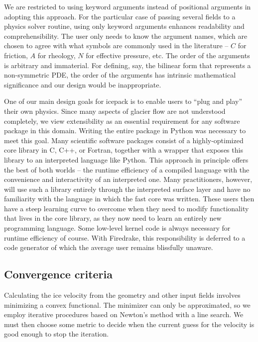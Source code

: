 \documentclass{article}
\theoremstyle{definition}
\theoremstyle{plain}
\begin{document}
We are restricted to using keyword arguments instead of positional arguments in adopting this approach.
For the particular case of passing several fields to a physics solver routine, using only keyword arguments enhances readability and comprehensibility.
The user only needs to know the argument names, which are chosen to agree with what symbols are commonly used in the literature -- $C$ for friction, $A$ for rheology, $N$ for effective pressure, etc.
The order of the arguments is arbitrary and immaterial.
For defining, say, the bilinear form that represents a non-symmetric PDE, the order of the arguments has intrinsic mathematical significance and our design would be inappropriate.

One of our main design goals for icepack is to enable users to ``plug and play'' their own physics.
Since many aspects of glacier flow are not understood completely, we view extensibility as an essential requirement for any software package in this domain.
Writing the entire package in Python was necessary to meet this goal.
Many scientific software packages consist of a highly-optimized core library in C, C++, or Fortran, together with a wrapper that exposes this library to an interpreted language like Python.
This approach in principle offers the best of both worlds -- the runtime efficiency of a compiled language with the convenience and interactivity of an interpreted one.
Many practitioners, however, will use such a library entirely through the interpreted surface layer and have no familiarity with the language in which the fast core was written.
These users then have a steep learning curve to overcome when they need to modify functionality that lives in the core library, as they now need to learn an entirely new programming language.
Some low-level kernel code is always necessary for runtime efficiency of course.
With Firedrake, this responsibility is deferred to a code generator of which the average user remains blissfully unaware.


\subsection{Convergence criteria} \label{sec:convergence-criteria}

Calculating the ice velocity from the geometry and other input fields involves minimizing a convex functional.
The minimizer can only be approximated, so we employ iterative procedures based on Newton's method with a line search.
We must then choose some metric to decide when the current guess for the velocity is good enough to stop the iteration.
\end{document}
